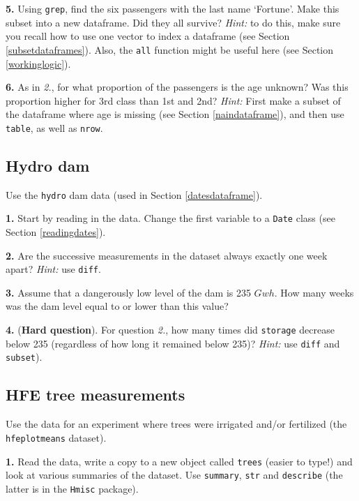 \documentclass[]{book}
\begin{document}
\textbf{5.} Using \texttt{grep}, find the six passengers with the last name `Fortune'. Make this subset into a new dataframe. Did they all survive? \emph{Hint:} to do this, make sure you recall how to use one vector to index a dataframe (see Section \ref{subsetdataframes}). Also, the \texttt{all} function might be useful here (see Section \ref{workinglogic}).

\textbf{6.} As in \emph{2.}, for what proportion of the passengers is the age unknown? Was this proportion higher for 3rd class than 1st and 2nd? \emph{Hint:} First make a subset of the dataframe where age is missing (see Section \ref{naindataframe}), and then use \texttt{table}, as well as \texttt{nrow}.

\hypertarget{hydro-dam}{%
\subsection{Hydro dam}\label{hydro-dam}}

Use the \texttt{hydro} dam data (used in Section \ref{datesdataframe}).

\textbf{1.} Start by reading in the data. Change the first variable to a \texttt{Date}
class (see Section \ref{readingdates}).

\textbf{2.} Are the successive measurements in the dataset always exactly one week apart? \emph{Hint:} use \texttt{diff}.

\textbf{3.} Assume that a dangerously low level of the dam is 235 \(Gwh\). How many weeks was the dam level equal to or lower than this value?

\textbf{4.} (\textbf{Hard question}). For question \emph{2.}, how many times did \texttt{storage} decrease below 235 (regardless of how long it remained below 235)? \emph{Hint:} use \texttt{diff} and \texttt{subset}).

\hypertarget{hfe-tree-measurements}{%
\subsection{HFE tree measurements}\label{hfe-tree-measurements}}

Use the data for an experiment where trees were irrigated and/or fertilized (the \texttt{hfeplotmeans} dataset).

\textbf{1.} Read the data, write a copy to a new object called \texttt{trees} (easier to type!) and look at various summaries of the dataset. Use \texttt{summary}, \texttt{str} and \texttt{describe} (the latter is in the \texttt{Hmisc} package).
\end{document}
